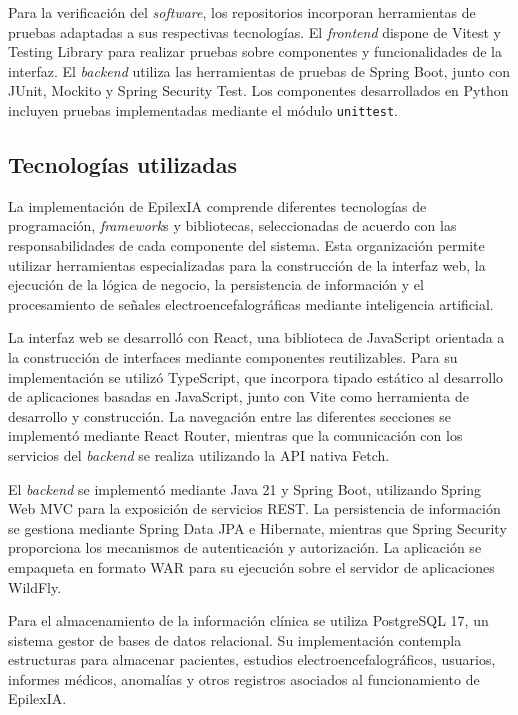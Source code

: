 Para la verificación del \textit{software}, los repositorios incorporan herramientas de pruebas adaptadas a sus respectivas tecnologías. El \textit{frontend} dispone de Vitest y Testing Library para realizar pruebas sobre componentes y funcionalidades de la interfaz. El \textit{backend} utiliza las herramientas de pruebas de Spring Boot, junto con JUnit, Mockito y Spring Security Test. Los componentes desarrollados en Python incluyen pruebas implementadas mediante el módulo \texttt{unittest}.

\subsection{Tecnologías utilizadas}

La implementación de EpilexIA comprende diferentes tecnologías de
programación, \textit{framework}s y bibliotecas, seleccionadas de acuerdo con
las responsabilidades de cada componente del sistema. Esta organización
permite utilizar herramientas especializadas para la construcción de
la interfaz web, la ejecución de la lógica de negocio, la persistencia
de información y el procesamiento de señales electroencefalográficas
mediante inteligencia artificial.

La interfaz web se desarrolló con React, una biblioteca de JavaScript
orientada a la construcción de interfaces mediante componentes
reutilizables. Para su implementación se utilizó TypeScript, que
incorpora tipado estático al desarrollo de aplicaciones basadas en
JavaScript, junto con Vite como herramienta de desarrollo y
construcción. La navegación entre las diferentes secciones se
implementó mediante React Router, mientras que la comunicación con
los servicios del \textit{backend} se realiza utilizando la API nativa Fetch.

El \textit{backend} se implementó mediante Java 21 y Spring Boot, utilizando
Spring Web MVC para la exposición de servicios REST. La persistencia
de información se gestiona mediante Spring Data JPA e Hibernate,
mientras que Spring Security proporciona los mecanismos de
autenticación y autorización. La aplicación se empaqueta en formato
WAR para su ejecución sobre el servidor de aplicaciones WildFly.

Para el almacenamiento de la información clínica se utiliza
PostgreSQL 17, un sistema gestor de bases de datos relacional. Su
implementación contempla estructuras para almacenar pacientes,
estudios electroencefalográficos, usuarios, informes médicos,
anomalías y otros registros asociados al funcionamiento de EpilexIA.


